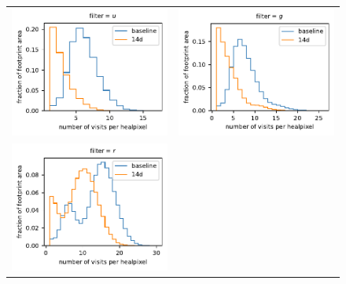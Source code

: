\documentclass[preprintm,linenumbers]{aastex631}
\begin{document}
      \begin{figure}
			\centering
			\begin{tabular}{@{}c@{}c@{}}
				\includegraphics{results/histograms/hist_first_year_one_snap_v4_0_10yrs_db_noDD_noTwi_CountMetric_doAllTemplateMetrics_reduceCount_u_14_noDD_noTwi.pdf} &
				 \includegraphics{results/histograms/hist_first_year_one_snap_v4_0_10yrs_db_noDD_noTwi_CountMetric_doAllTemplateMetrics_reduceCount_g_14_noDD_noTwi.pdf} \\
				 \includegraphics{results/histograms/hist_first_year_one_snap_v4_0_10yrs_db_noDD_noTwi_CountMetric_doAllTemplateMetrics_reduceCount_r_14_noDD_noTwi.pdf} &

\end{tabular}
\end{figure}
\end{document}
